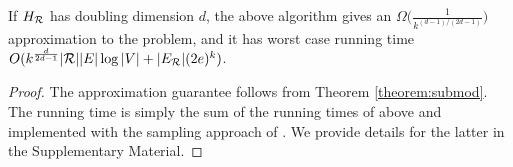 \begin{theorem}
\label{theorem:maxcrit}
If $H_{\mathcal{R}}$ has doubling dimension $d$, the above algorithm gives an $\Omega\Big(\frac{1}{k^{(d-1)/(2d-1)}}\Big)$ approximation to the \maxcrit{} problem, and it has worst case running time $O(k^{\frac{d}{2d-1}}|\mathcal{R}||E|\log{|V|} + |E_{\mathcal{R}}|(2e)^k)$. %
\end{theorem}

\begin{proof}
The approximation guarantee follows from Theorem \ref{theorem:submod}. The running time is simply the sum of the running times of \algomaxst{} above and  \algosubmod{} implemented with the sampling approach of \cite{borgs:soda14}. We provide details for the latter in the Supplementary Material.
\end{proof}


